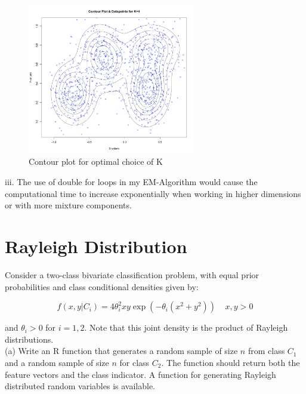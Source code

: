\documentclass{article}
\begin{document}
\begin{figure}[H]
\begin{center}
\includegraphics[width=0.65\textwidth]{Q1b} %
\caption{Contour plot for optimal choice of K}
\end{center}
\end{figure}

iii. The use of double for loops in my  EM-Algorithm would cause the computational time to increase exponentially when working in higher dimensions or with more mixture components.


\section{Rayleigh Distribution}
Consider a two-class bivariate classification problem, with equal prior probabilities and class conditional densities given by:

$$ f(x,y|C_{i})= 4\theta_{i}^2xy\exp(-\theta_{i}(x^2+y^2)) \  \ \ \ \ x,y>0$$

and $ \theta_{i}> 0$  for $i=1,2$. Note that this joint density is the product of Rayleigh distributions.\\ 


(a) Write an R function that generates a random sample of size $n$ from class $C_{1}$ and a random sample of size $n$ for class $C_{2}$. The function should return both the feature vectors and the class indicator. A function for generating Rayleigh distributed random variables is available.\\
\end{document}

